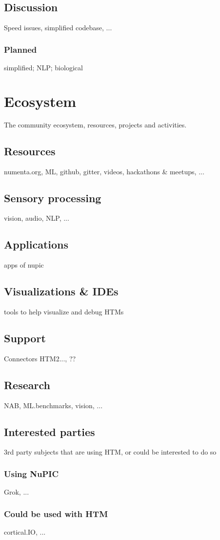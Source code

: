 \documentclass[a4,IEEEconf]{article}
\begin{document}
\subsection{Discussion}
Speed issues, simplified codebase, ...
\subsubsection{Planned}
simplified; NLP; biological

\section{Ecosystem}
The community ecosystem, resources, projects and activities. 
\subsection{Resources}
numenta.org, ML, github, gitter, videos, hackathons \& meetups, ...
\subsection{Sensory processing}
vision, audio, NLP, ...
\subsection{Applications}
apps of nupic
\subsection{Visualizations \& IDEs}
tools to help visualize and debug HTMs
\subsection{Support}
Connectors HTM2..., ??
\subsection{Research}
NAB, ML.benchmarks, vision, ...
\subsection{Interested parties}
3rd party subjects that are using HTM, or could be interested to do so
\subsubsection{Using NuPIC}
Grok, ...
\subsubsection{Could be used with HTM}
cortical.IO, ...
\end{document}
